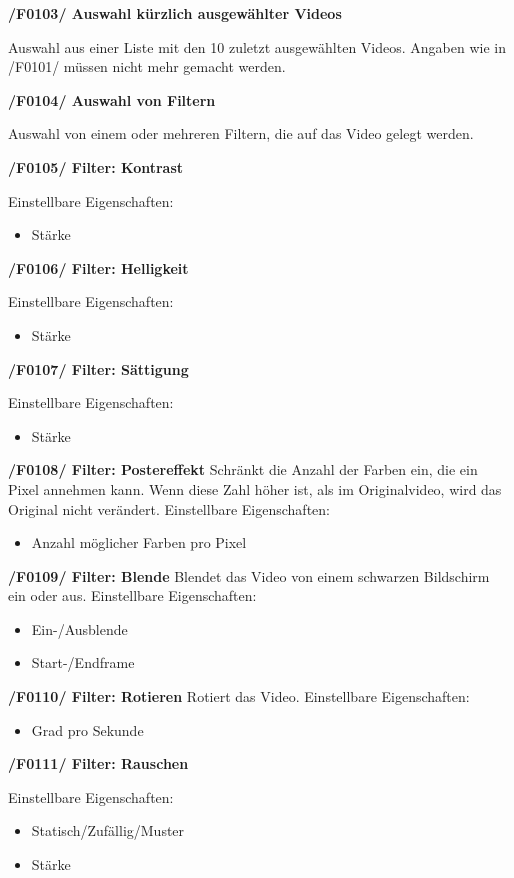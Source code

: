 \documentclass[parskip=full]{scrartcl}
\begin{document}
\textbf{/F0103/ Auswahl kürzlich ausgewählter Videos}

Auswahl aus einer Liste mit den 10 zuletzt ausgewählten Videos. Angaben wie in /F0101/ müssen
nicht mehr gemacht werden.

\textbf{/F0104/ Auswahl von Filtern}

Auswahl von einem oder mehreren Filtern, die auf das Video gelegt werden.

\textbf{/F0105/ Filter: Kontrast}

Einstellbare Eigenschaften:
\begin{itemize}
\item Stärke
\end{itemize}

\textbf{/F0106/ Filter: Helligkeit}

Einstellbare Eigenschaften:
\begin{itemize}
\item Stärke
\end{itemize}

\textbf{/F0107/ Filter: Sättigung}

Einstellbare Eigenschaften:
\begin{itemize}
\item Stärke
\end{itemize}

\textbf{/F0108/ Filter: Postereffekt}
Schränkt die Anzahl der Farben ein, die ein Pixel annehmen kann. Wenn diese Zahl höher ist, als im Originalvideo, wird das Original nicht verändert.
Einstellbare Eigenschaften:
\begin{itemize}
\item Anzahl möglicher Farben pro Pixel
\end{itemize}

\textbf{/F0109/ Filter: Blende}
Blendet das Video von einem schwarzen Bildschirm ein oder aus.
Einstellbare Eigenschaften:
\begin{itemize}
\item Ein-/Ausblende
\item Start-/Endframe
\end{itemize}

\textbf{/F0110/ Filter: Rotieren}
Rotiert das Video.
Einstellbare Eigenschaften:
\begin{itemize}
\item Grad pro Sekunde
\end{itemize}

\textbf{/F0111/ Filter: Rauschen}

Einstellbare Eigenschaften:
\begin{itemize}
\item Statisch/Zufällig/Muster
\item Stärke
\end{itemize}
\end{document}
